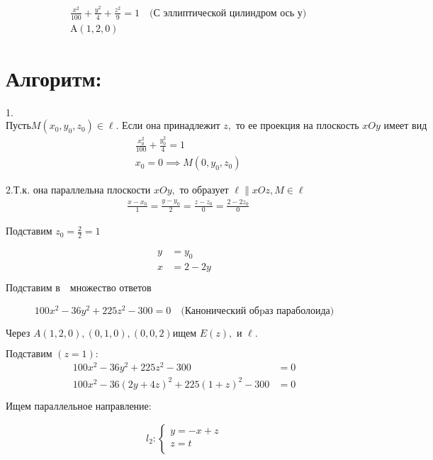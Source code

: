 \documentclass[a4paper,14pt]{extreport} %
\begin{document}
\begin{align*}
&\frac{x^2}{100} + \frac{y^2}{4} + \frac{z^2}{9} = 1 \quad \text{(С эллиптической цилиндром ось у)}\\
&\text{A}(1, 2, 0)
\end{align*}

\section*{Алгоритм:}

1.$ \text{Пусть} M(x_0, y_0, z_0) \in \ell. \text{ Если она принадлежит } z, \text{ то ее проекция на плоскость } xOy \text{ имеет вид} $
\begin{align*}
&\frac{x_0^2}{100} + \frac{y_0^2}{4} = 1 \\
&x_0 = 0 \implies M(0, y_0, z_0)
\end{align*}

2.$ \text{Т.к. она параллельна плоскости } xOy, \text{ то образует } \ell \parallel xOz, M \in \ell $
\begin{align*}
&\frac{x - x_0}{1} = \frac{y - y_0}{2} = \frac{z - z_0}{0} = \frac{2 - 2z_0}{0}
\end{align*}

Подставим $z_0 = \frac{2}{2} = 1$

\begin{align*}
y &= y_0 \\
x &= 2 - 2y
\end{align*}

$\text{Подставим в} \quad \boxed{\text{множество ответов}}$

\begin{align*}
100x^2 - 36y^2 + 225z^2 - 300 = 0 \quad \text{(Канонический обpаз параболоида)}
\end{align*}

$\text{Через } A(1, 2, 0), (0, 1, 0), (0, 0, 2) \text{ищем } E(z), \text{ и } \ell.$

$\text{Подставим } (z = 1):$
\begin{align*}
100x^2 - 36y^2 + 225z^2 - 300 &= 0 \\
100x^2 - 36(2y + 4z)^2 + 225(1 + z)^2 - 300 &= 0
\end{align*}

$\text{Ищем параллельное направление}:$

\begin{align*}
l_2 : 
\begin{cases}
y = -x + z \\
z = t \\
\end{cases}
\end{align*}
\end{document}

